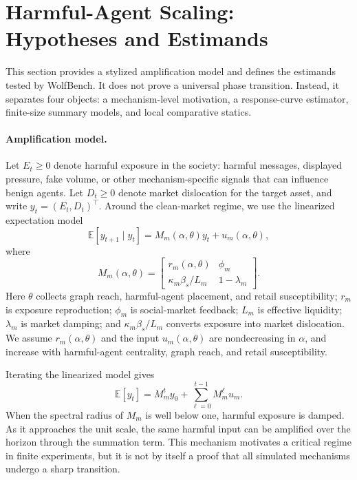 \documentclass[letterpaper]{article} %
\begin{document}
\section{Harmful-Agent Scaling: Hypotheses and Estimands}

This section provides a stylized amplification model and defines the estimands
tested by WolfBench. It does not prove a universal phase transition. Instead,
it separates four objects: a mechanism-level motivation, a response-curve
estimator, finite-size summary models, and local comparative statics.

\paragraph{Amplification model.}
Let \(E_t\geq 0\) denote harmful exposure in the society: harmful messages,
displayed pressure, fake volume, or other mechanism-specific signals that can
influence benign agents. Let \(D_t\geq 0\) denote market dislocation for the
target asset, and write \(y_t=(E_t,D_t)^\top\). Around the clean-market regime,
we use the linearized expectation model
\[
    \mathbb{E}[y_{t+1}\mid y_t]
    =
    M_m(\alpha,\theta)y_t+u_m(\alpha,\theta),
\]
where
\[
    M_m(\alpha,\theta)=
    \begin{bmatrix}
    r_m(\alpha,\theta) & \phi_m\\
    \kappa_m\beta_s/L_m & 1-\lambda_m
    \end{bmatrix}.
\]
Here \(\theta\) collects graph reach, harmful-agent placement, and retail
susceptibility; \(r_m\) is exposure reproduction; \(\phi_m\) is social-market
feedback; \(L_m\) is effective liquidity; \(\lambda_m\) is market damping; and
\(\kappa_m\beta_s/L_m\) converts exposure into market dislocation. We assume
\(r_m(\alpha,\theta)\) and the input \(u_m(\alpha,\theta)\) are nondecreasing in
\(\alpha\), and increase with harmful-agent centrality, graph reach, and retail
susceptibility.

Iterating the linearized model gives
\[
    \mathbb{E}[y_t]
    =
    M_m^t y_0+\sum_{\ell=0}^{t-1}M_m^\ell u_m .
\]
When the spectral radius of \(M_m\) is well below one, harmful exposure is
damped. As it approaches the unit scale, the same harmful input can be
amplified over the horizon through the summation term. This mechanism motivates
a critical regime in finite experiments, but it is not by itself a proof that
all simulated mechanisms undergo a sharp transition.
\end{document}
